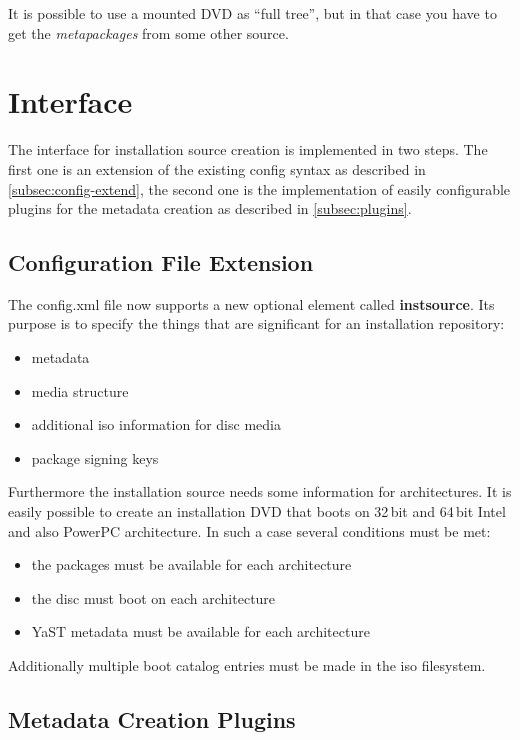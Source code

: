 It is possible to use a mounted DVD as ``full tree'', but in that case you have
to get the \textit{meta\-packages} from some other source.


\section{Interface}
\label{sec:interface}

The interface for installation source creation is implemented in two steps. The
first one is an extension of the existing config syntax as described in
\vref{subsec:config-extend}, the second one is the implementation of easily
configurable plugins for the metadata creation as described in
\vref{subsec:plugins}.


\subsection{Configuration File Extension}
\label{subsec:config-extend}

The config.xml file now supports a new optional element called
\textbf{instsource}. Its purpose is to specify the things that are significant
for an installation repository:
\begin{itemize}
  \item{metadata}
  \item{media structure}
  \item{additional iso information for disc media}
  \item{package signing keys}
\end{itemize}

Furthermore the installation source needs some information for architectures. It
is easily possible to create an installation DVD that boots on 32\,bit and
64\,bit Intel and also PowerPC architecture. In such a case several conditions
must be met:
\begin{itemize}
  \item{the packages must be available for each architecture}
  \item{the disc must boot on each architecture}
  \item{YaST metadata must be available for each architecture}
\end{itemize}
Additionally multiple boot catalog entries must be made in the iso filesystem.


\subsection{Metadata Creation Plugins}
\label{subsec:plugins}

